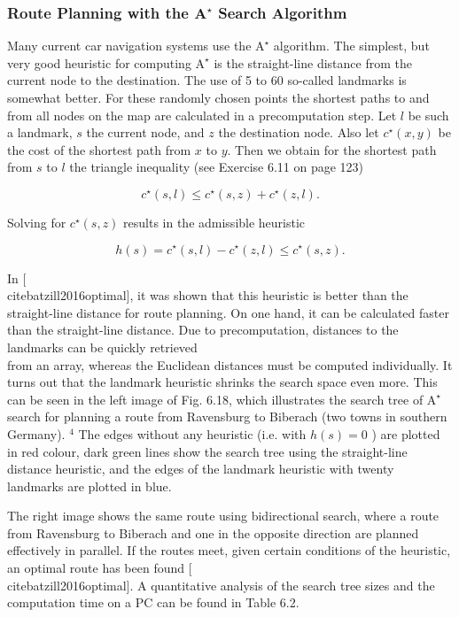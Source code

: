 \documentclass[10pt]{book}
\begin{document}
\subsubsection*{Route Planning with the $\mathbf{A}^{\boldsymbol{\star}}$ Search Algorithm}
Many current car navigation systems use the $\mathrm{A}^{\star}$ algorithm. The simplest, but very good heuristic for computing $\mathrm{A}^{\star}$ is the straight-line distance from the current node to the destination. The use of 5 to 60 so-called landmarks is somewhat better. For these randomly chosen points the shortest paths to and from all nodes on the map are calculated in a precomputation step. Let $l$ be such a landmark, $s$ the current node, and $z$ the destination node. Also let $c^{\star}(x, y)$ be the cost of the shortest path from $x$ to $y$. Then we obtain for the shortest path from $s$ to $l$ the triangle inequality (see Exercise 6.11 on page 123)

$$
c^{\star}(s, l) \leq c^{\star}(s, z)+c^{\star}(z, l) .
$$

Solving for $c^{\star}(s, z)$ results in the admissible heuristic

$$
h(s)=c^{\star}(s, l)-c^{\star}(z, l) \leq c^{\star}(s, z) .
$$

In [\\cite{batzill2016optimal}], it was shown that this heuristic is better than the straight-line distance for route planning. On one hand, it can be calculated faster than the straight-line distance. Due to precomputation, distances to the landmarks can be quickly retrieved\\
from an array, whereas the Euclidean distances must be computed individually. It turns out that the landmark heuristic shrinks the search space even more. This can be seen in the left image of Fig. 6.18, which illustrates the search tree of $\mathrm{A}^{\star}$ search for planning a route from Ravensburg to Biberach (two towns in southern Germany). ${ }^{4}$ The edges without any heuristic (i.e. with $h(s)=0$ ) are plotted in red colour, dark green lines show the search tree using the straight-line distance heuristic, and the edges of the landmark heuristic with twenty landmarks are plotted in blue.

The right image shows the same route using bidirectional search, where a route from Ravensburg to Biberach and one in the opposite direction are planned effectively in parallel. If the routes meet, given certain conditions of the heuristic, an optimal route has been found [\\cite{batzill2016optimal}]. A quantitative analysis of the search tree sizes and the computation time on a PC can be found in Table 6.2.
\end{document}
